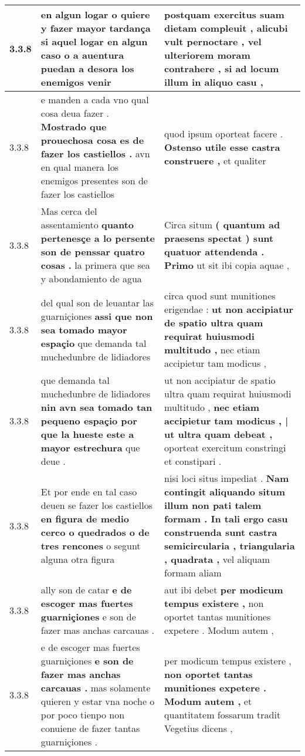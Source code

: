 \begin{tabular}{|p{1cm}|p{6.5cm}|p{6.5cm}|}
3.3.8 & en algun logar \textbf{ o quiere y fazer mayor tardança } si aquel logar en algun caso o a auentura puedan a desora los enemigos venir & postquam exercitus suam dietam compleuit , \textbf{ alicubi vult pernoctare , vel ulteriorem moram contrahere , } si ad locum illum in aliquo casu , \\\hline
3.3.8 & e manden a cada vno qual cosa deua fazer . \textbf{ Mostrado que prouechosa cosa es de fazer los castiellos . } avn en qual manera los enemigos presentes son de fazer los castiellos & quod ipsum oporteat facere . \textbf{ Ostenso utile esse castra construere , } et qualiter \\\hline
3.3.8 & Mas cerca del assentamiento \textbf{ quanto pertenesçe a lo persente son de penssar quatro cosas . } la primera que sea y abondamiento de agua & Circa situm \textbf{ ( quantum ad praesens spectat ) sunt quatuor attendenda . Primo } ut sit ibi copia aquae , \\\hline
3.3.8 & del qual son de leuantar las guarniçiones \textbf{ assi que non sea tomado mayor espaçio } que demanda tal muchedunbre de lidiadores & circa quod sunt munitiones erigendae : \textbf{ ut non accipiatur de spatio ultra quam requirat huiusmodi multitudo , } nec etiam accipietur tam modicus , \\\hline
3.3.8 & que demanda tal muchedunbre de lidiadores \textbf{ nin avn sea tomado tan pequeno espaçio por que la hueste este a mayor estrechura } que deue . & ut non accipiatur de spatio ultra quam requirat huiusmodi multitudo , \textbf{ nec etiam accipietur tam modicus , | ut ultra quam debeat , } oporteat exercitum constringi et constipari . \\\hline
3.3.8 & Et por ende en tal caso deuen se fazer los castiellos \textbf{ en figura de medio cerco o quedrados o de tres rencones } o segunt alguna otra figura & nisi loci situs impediat . \textbf{ Nam contingit aliquando situm illum non pati talem formam . In tali ergo casu construenda sunt castra semicircularia , triangularia , quadrata , } vel aliquam formam aliam \\\hline
3.3.8 & ally son de catar \textbf{ e de escoger mas fuertes guarniçiones } e son de fazer mas anchas carcauas . & aut ibi debet \textbf{ per modicum tempus existere , } non oportet tantas munitiones expetere . Modum autem , \\\hline
3.3.8 & e de escoger mas fuertes guarniçiones \textbf{ e son de fazer mas anchas carcauas . } mas solamente quieren y estar vna noche o por poco tienpo non conuiene de fazer tantas guarniçiones . & per modicum tempus existere , \textbf{ non oportet tantas munitiones expetere . Modum autem , } et quantitatem fossarum tradit Vegetius dicens , \\\hline

\end{tabular}
